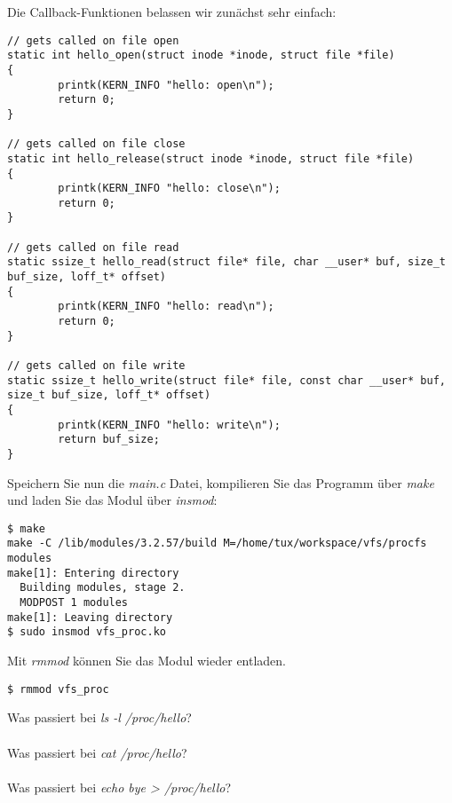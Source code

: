 Die Callback-Funktionen belassen wir zunächst sehr einfach:
\begin{lstlisting}
// gets called on file open
static int hello_open(struct inode *inode, struct file *file)
{
        printk(KERN_INFO "hello: open\n");
        return 0;
}

// gets called on file close
static int hello_release(struct inode *inode, struct file *file)
{
        printk(KERN_INFO "hello: close\n");
        return 0;
}

// gets called on file read
static ssize_t hello_read(struct file* file, char __user* buf, size_t buf_size, loff_t* offset)
{
        printk(KERN_INFO "hello: read\n");
        return 0;
}

// gets called on file write
static ssize_t hello_write(struct file* file, const char __user* buf, size_t buf_size, loff_t* offset)
{
        printk(KERN_INFO "hello: write\n");
        return buf_size;
}
\end{lstlisting}

Speichern Sie nun die \emph{main.c} Datei, kompilieren Sie das Programm über \emph{make} und laden Sie das Modul über
\emph{insmod}:
\begin{lstlisting}
$ make
make -C /lib/modules/3.2.57/build M=/home/tux/workspace/vfs/procfs modules
make[1]: Entering directory
  Building modules, stage 2.
  MODPOST 1 modules
make[1]: Leaving directory
$ sudo insmod vfs_proc.ko
\end{lstlisting}

Mit \emph{rmmod} können Sie das Modul wieder entladen.
\begin{lstlisting}
$ rmmod vfs_proc
\end{lstlisting}
\clearpage
Was passiert bei \emph{ls -l /proc/hello}? \\

\underline{\hspace{\textwidth}} \\

Was passiert bei \emph{cat /proc/hello}? \\

\underline{\hspace{\textwidth}} \\

Was passiert bei \emph{echo bye > /proc/hello}? \\

\underline{\hspace{\textwidth}} \\


